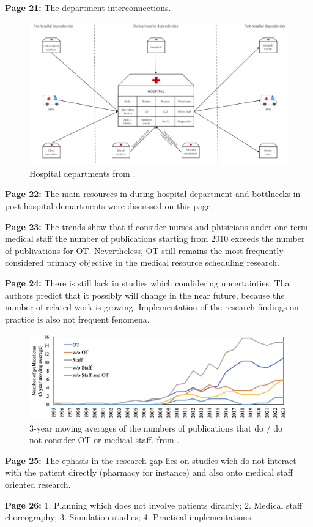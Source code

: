     \textbf{Page 21:}
    The department interconnections.
    \begin{figure}[H]
        \centering
        \includegraphics[width=1\textwidth]{figures/0010_SR02NL23/fig9.png}
        \caption{Hospital departments from \cite{x338}.}
        \label{fig9:0010_SR02NL23}
    \end{figure}
    
    \textbf{Page 22:}
    The main resources in during-hospital department and bottlnecks in post-hospital demartments were discussed on this page.
    
    \textbf{Page 23:}
    The trends show that if consider nurses and phisicians ander one term medical staff the number of publications starting from 2010 exceeds the number of publivations for OT. Nevertheless, OT still remains the most frequently considered primary objective in the medical resource scheduling research.
    
    \textbf{Page 24:}
    There is still lack in studies which condidering uncertainties. Tha authors predict that it possibly will change in the near future, because the number of related work is growing. Implementation of the research findings on practice is also not frequent fenomena.
    \begin{figure}[H]
        \centering
        \includegraphics[width=1\textwidth]{figures/0010_SR02NL23/fig10.png}
        \caption{3-year moving averages of the numbers of publications that do / do not consider OT or medical staff. from \cite{x338}.}
        \label{fig10:0010_SR02NL23}
    \end{figure}

    \textbf{Page 25:}
    The ephasis in the research gap lies on studies wich do not interact with the patient directly (pharmacy for instance) and also onto medical staff oriented research.

    \textbf{Page 26:}
        1. Planning which does not involve patients diractly; 2. Medical staff choreography; 3. Simulation studies; 4. Practical implementations.